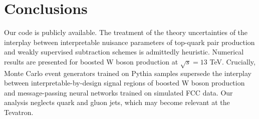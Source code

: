 \section{Conclusions}\label{sec:conclusions}

Our code is publicly available. The treatment of the theory
uncertainties of the interplay between interpretable nuisance parameters
of top-quark pair production and weakly supervised subtraction schemes
is admittedly heuristic. Numerical results are presented for boosted W
boson production at $\sqrt{s} = 13$ TeV. Crucially, Monte Carlo event
generators trained on Pythia samples supersede the interplay between
interpretable-by-design signal regions of boosted W boson production and
message-passing neural networks trained on simulated FCC data. Our
analysis neglects quark and gluon jets, which may become relevant at the
Tevatron.

